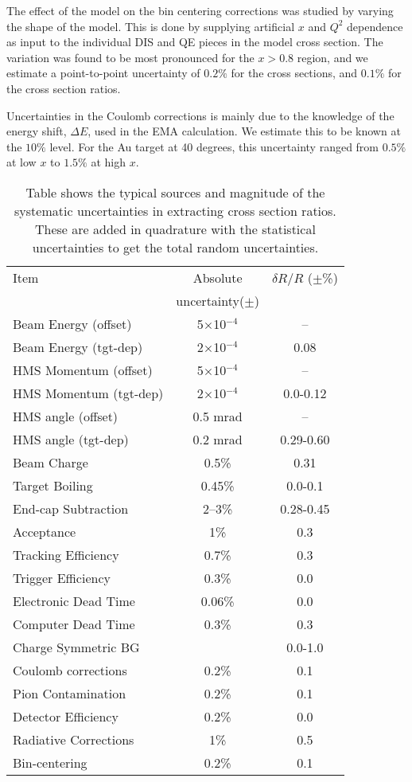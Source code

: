 {The effect of the model on the bin centering corrections was studied by
varying the shape of the model. This is done by supplying artificial $x$ and
$Q^2$ dependence as input to the individual DIS and QE pieces in the model
cross section. The variation was found to be most pronounced for the $x>$0.8
region, and we estimate a point-to-point uncertainty of $0.2\%$ for the
cross sections, and $0.1\%$ for the cross section ratios.

Uncertainties in the Coulomb corrections is mainly due to the knowledge of
the energy shift, $\Delta E$, used in the EMA calculation. We estimate this to
be known at the $10\%$ level. For the Au target at 40 degrees, this
uncertainty ranged from $0.5\%$ at low $x$ to $1.5\%$ at high $x$.

\begin{table}[htb]
\caption[]{Table shows the typical sources and magnitude of the systematic
uncertainties in extracting cross section ratios. These are added in
quadrature with the statistical uncertainties to get the total random
uncertainties.}
    \begin{tabular}{lcc}
	 \hline
	 \hline
	 Item & Absolute & $\delta R/R$ ($\pm$\%) \\
       & uncertainty($\pm$) &        \\
	 \hline
Beam Energy (offset)    & 5$\times$10$^{-4}$ 	& --   \\
Beam Energy (tgt-dep)	& 2$\times$10$^{-4}$ 	& 0.08    \\
HMS Momentum (offset)  	& 5$\times$10$^{-4}$ 	& --  \\
HMS Momentum (tgt-dep) 	& 2$\times$10$^{-4}$ 	& 0.0-0.12  \\
HMS angle (offset)   	& 0.5 mrad      	& -- \\
HMS angle (tgt-dep)	& 0.2 mrad		& 0.29-0.60 \\
Beam Charge       	& 0.5\%       	& 0.31 \\
Target Boiling     	& 0.45\%       	& 0.0-0.1 \\
End-cap Subtraction   	& 2--3\%       	& 0.28-0.45 \\
Acceptance       	& 1\%        	& 0.3 \\
Tracking Efficiency   	& 0.7\%       	& 0.3 \\
Trigger Efficiency   	& 0.3\%       	& 0.0 \\
Electronic Dead Time  	& 0.06\%       	& 0.0 \\
Computer Dead Time   	& 0.3\%       	& 0.3 \\
Charge Symmetric BG   	&          	& 0.0-1.0 \\ 
Coulomb corrections   	& 0.2\%       	& 0.1 \\
Pion Contamination   	& 0.2\%       	& 0.1 \\
Detector Efficiency   	& 0.2\%       	& 0.0 \\
Radiative Corrections  	& 1\%        	& 0.5 \\
Bin-centering      	& 0.2\%       	& 0.1 \\
    

\end{tabular}
\end{table}}
